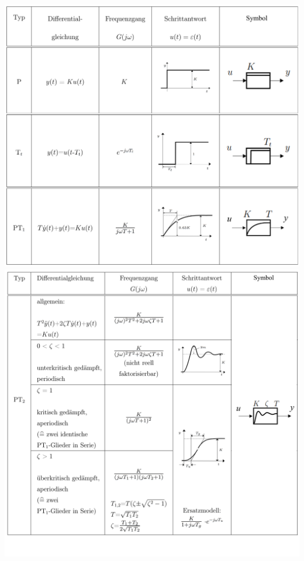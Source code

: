			\includegraphics[width=13.5 cm]{./bilder/grundglieder/tabelle/glieder1.png} \\
			\includegraphics[width=13.5 cm]{./bilder/grundglieder/tabelle/glieder2.png} \\
